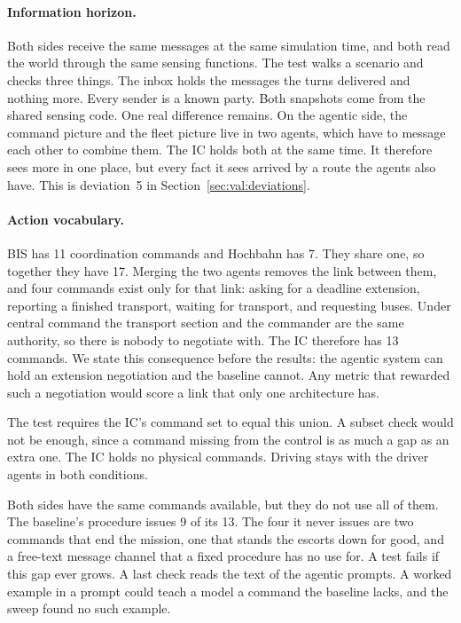 \paragraph{Information horizon.} Both sides receive the same messages at the
same simulation time, and both read the world through the same sensing
functions. The test walks a scenario and checks three things. The inbox holds
the messages the turns delivered and nothing more. Every sender is a known
party. Both snapshots come from the shared sensing code. One real difference
remains. On the agentic side, the command picture and the fleet picture live
in two agents, which have to message each other to combine them. The IC holds
both at the same time. It therefore sees more in one place, but every fact it
sees arrived by a route the agents also have. This is deviation~5 in
Section~\ref{sec:val:deviations}.

\paragraph{Action vocabulary.} BIS has 11 coordination commands and Hochbahn
has 7. They share one, so together they have 17. Merging the two agents removes
the link between them, and four commands exist only for that link: asking for
a deadline extension, reporting a finished transport, waiting for transport,
and requesting buses. Under central command the transport section and the
commander are the same authority, so there is nobody to negotiate with. The IC
therefore has 13 commands. We state this consequence before the results: the
agentic system can hold an extension negotiation and the baseline cannot. Any
metric that rewarded such a negotiation would score a link that only one
architecture has.

The test requires the IC's command set to equal this union. A subset check
would not be enough, since a command missing from the control is as much a gap
as an extra one. The IC holds no physical commands. Driving stays with the
driver agents in both conditions.

Both sides have the same commands available, but they do not use all of them.
The baseline's procedure issues 9 of its 13. The four it never issues are two
commands that end the mission, one that stands the escorts down for good, and a
free-text message channel that a fixed procedure has no use for. A test fails
if this gap ever grows. A last check reads the text of the agentic prompts. A
worked example in a prompt could teach a model a command the baseline lacks,
and the sweep found no such example.

